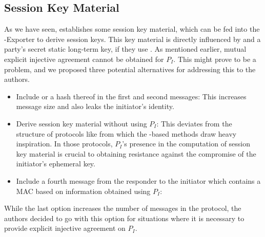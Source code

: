 \documentclass[runningheads]{llncs}
\begin{document}
\subsection{Session Key Material}
\label{sec:sessionKeyMaterial}
As we have seen, \mEdhoc{} establishes some
session key material, which can be fed into the \mEdhoc{}-Exporter to derive
session keys.
%
This key material is directly influenced by \mGxy{} and a party's secret static
long-term key, if they use \mStat{}.
%
As mentioned earlier, mutual explicit injective agreement cannot be obtained 
for
$P_{I}$.
%
This might prove to be a problem, and we proposed three potential 
alternatives
for addressing this to the \mEdhoc{} authors.
%
\begin{itemize}
    \item Include \mIdcredi{} or a hash thereof in the first and
    second messages:
%
    This increases message size and also leaks the initiator's identity.
%
    \item Derive session key material without using $P_{I}$:
%
    This deviates from the structure of protocols like \mOptls{} from which the
    \mStat{}-based methods draw heavy inspiration.
%
    In those protocols, $P_{I}$'s presence in the computation of session key
    material is crucial to obtaining resistance against the compromise of the
    initiator's ephemeral key.
%
    \item Include a fourth message from the
    responder to the initiator which contains a MAC based on information
    obtained using $P_{I}$:
\end{itemize}
%
While the last option increases the number of messages in the protocol, the
\mEdhoc{} authors decided to go with this option for situations where it is
necessary to provide explicit injective agreement on $P_{I}$.
%

\end{document}
